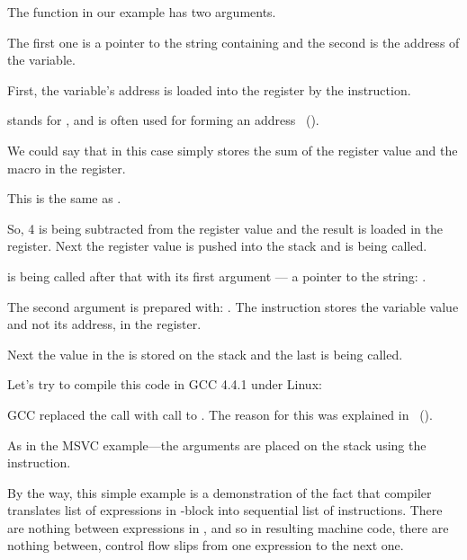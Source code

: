 The \scanf function in our example has two arguments.

The first one is a pointer to the string containing  and the second is the address of the  variable.

First, the  variable's address is loaded into the \EAX register by the  instruction.

\LEA stands for , and is often used for forming an address ~().

We could say that in this case \LEA simply stores the sum of the \EBP register value and the  macro in the \EAX register.

This is the same as .

So, 4 is being subtracted from the \EBP register value and the result is loaded in the \EAX register.
Next the \EAX register value is pushed into the stack and \scanf is being called.

\printf is being called after that with its first argument --- a pointer to the string:
.

The second argument is prepared with: .
The instruction stores the  variable value and not its address, in the \ECX register.

Next the value in the \ECX is stored on the stack and the last \printf is being called.




Let's try to compile this code in GCC 4.4.1 under Linux:



GCC replaced the \printf call with call to \puts. The reason for this was explained in ~().

% 

As in the MSVC example---the arguments are placed on the stack using the \MOV instruction.


By the way, this simple example is a demonstration of the fact that compiler translates
list of expressions in \CCpp-block into sequential list of instructions.
There are nothing between expressions in \CCpp, and so in resulting machine code, 
there are nothing between, control flow slips from one expression to the next one.

